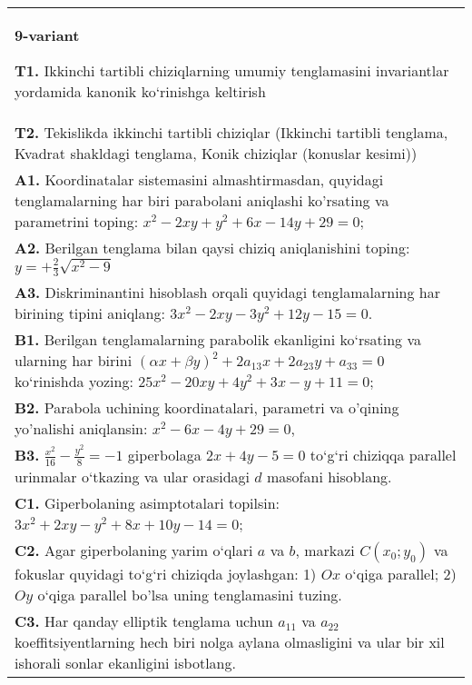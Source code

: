 \documentclass{article}
\begin{document}
\begin{tabular}{m{17cm}}
\textbf{9-variant}
\newline

\textbf{T1.} Ikkinchi tartibli chiziqlarning umumiy tenglamasini invariantlar yordamida kanonik ko‘rinishga keltirish \\
\textbf{T2.} Tekislikda ikkinchi tartibli chiziqlar (Ikkinchi tartibli tenglama, Kvadrat shakldagi tenglama, Konik chiziqlar (konuslar kesimi)) \\
\textbf{A1.} Koordinatalar sistemasini almashtirmasdan, quyidagi tenglamalarning har biri parabolani aniqlashi ko'rsating va parametrini toping: $x^2-2 x y+y^2+6 x-14 y+29=0$; \\
\textbf{A2.} Berilgan tenglama bilan qaysi chiziq aniqlanishini toping: $y=+\frac{2}{3} \sqrt{x^2-9}$ \\
\textbf{A3.} Diskriminantini hisoblash orqali quyidagi tenglamalarning har birining tipini aniqlang: $3 x^2-2 x y-3 y^2+12 y-15=0$. \\
\textbf{B1.} Berilgan tenglamalarning parabolik ekanligini ko‘rsating va ularning har birini $(\alpha x+\beta y)^2+2 a_{13} x+2 a_{23} y+a_{33}=0$ ko‘rinishda yozing: $25 x^2-20 x y+4 y^2+3 x-y+11=0$; \\
\textbf{B2.} Parabola uchining koordinatalari, parametri va o'qining yo'nalishi aniqlansin: $x^2-6 x-4 y+29=0$, \\
\textbf{B3.} $\frac{x^2}{16}-\frac{y^2}{8}=-1$ giperbolaga $2 x+4 y-5=0$ to‘g‘ri chiziqqa parallel urinmalar o‘tkazing va ular orasidagi $d$ masofani hisoblang. \\
\textbf{C1.} Giperbolaning asimptotalari topilsin: $3 x^2+2 x y-y^2+8 x+10 y-14=0$; \\
\textbf{C2.} Agar giperbolaning yarim o‘qlari $a$ va $b$, markazi $C\left(x_0; y_0\right) $ va fokuslar quyidagi to‘g‘ri chiziqda joylashgan: 1) $O x$ o‘qiga parallel; 2) $O y$ o‘qiga parallel bo'lsa uning tenglamasini tuzing. \\
\textbf{C3.} Har qanday elliptik tenglama uchun $a_{11}$ va $a_{22}$ koeffitsiyentlarning hech biri nolga aylana olmasligini va ular bir xil ishorali sonlar ekanligini isbotlang. \\

\end{tabular}
\vspace{1cm}
\end{document}
